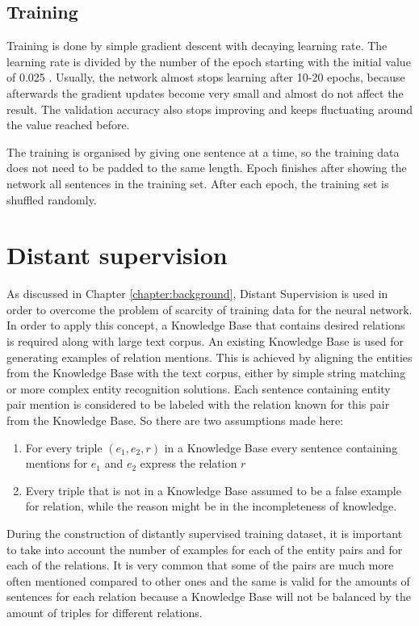 \subsection{Training}
Training is done by simple gradient descent with decaying learning rate. The learning rate is 
divided by the number of the epoch starting with the initial value of 0.025 \cite{DBLP:journals/corr/SantosXZ15}. Usually, the 
network almost stops learning after 10-20 epochs, because afterwards the 
gradient updates become very small and almost do not affect the result. 
The validation accuracy also stops improving and keeps fluctuating around the value reached before.

The training is organised by giving one sentence at a time, so the training data does not need 
to be padded to the same length. Epoch finishes after showing the network all sentences in the 
training set. After each epoch, the training set is shuffled randomly.

\section{Distant supervision}
As discussed in Chapter \ref{chapter:background}, Distant Supervision is used in order to overcome the problem of scarcity of training data for 
the neural network. In order to apply this concept, a Knowledge Base that contains desired relations 
is required along with large text corpus. An existing Knowledge Base is used for generating examples of relation 
mentions. This is achieved by aligning the entities from the Knowledge Base with the text corpus, either by simple string matching or more complex entity recognition solutions. Each sentence 
containing entity pair mention is considered to be labeled with the relation known for this pair 
from the Knowledge Base. So there are two assumptions made here:

\begin{enumerate}
  \item For every triple $(e_1, e_2, r)$ in a Knowledge Base every sentence containing mentions for 
  $e_1$ and $e_2$  express the relation $r$
  \item Every triple that is not in a Knowledge Base assumed to be a false example for relation, while 
   the reason might be in the incompleteness of knowledge.
\end{enumerate}

During the 
construction of distantly supervised training dataset, it is important to take into account the 
number of examples for each of the entity pairs and for each of the relations. It is very common 
that some of the pairs are much more often mentioned compared to other ones and the same 
is valid for the amounts of sentences for each relation because a Knowledge Base will not be 
balanced by the amount of triples for different relations.

